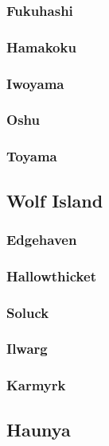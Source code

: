 		\subsubsection{Fukuhashi}

		\subsubsection{Hamakoku}

		\subsubsection{Iwoyama}

		\subsubsection{Oshu}

		\subsubsection{Toyama}

	\subsection{Wolf Island}

		\subsubsection{Edgehaven}

		\subsubsection{Hallowthicket}

		\subsubsection{Soluck}

		\subsubsection{Ilwarg}

		\subsubsection{Karmyrk}

	\subsection{Haunya}

